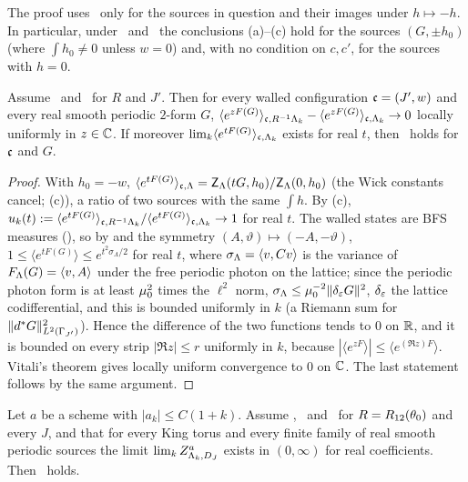The proof uses \hypF\ only for the sources in question and their images under $h\mapsto-h$. In particular, under \hypFz\ and \hypV\ the conclusions (a)--(c) hold for the sources $(G,\pm h_0)$ (where $\int h_0\ne0$ unless $w=0$) and, with no condition on $c,c'$, for the sources with $h=0$.

\begin{corollary}\label{rot:cor:walled}
Assume \hypFz\ and \hypV\ for $R$ and $J'$. Then for every walled configuration $\mathfrak c=(J',w)$ and every real smooth periodic $2$-form $G$, $\langle e^{zF(G)}\rangle_{\mathfrak c,R^{-1}\Lambda_k}-\langle e^{zF(G)}\rangle_{\mathfrak c,\Lambda_k}\to0$ locally uniformly in $z\in\mathbb C$. If moreover $\lim_k\langle e^{tF(G)}\rangle_{\mathfrak c,\Lambda_k}$ exists for real $t$, then \Kz\ holds for $\mathfrak c$ and $G$.
\end{corollary}

\begin{proof}
With $h_0=-w$, $\langle e^{tF(G)}\rangle_{\mathfrak c,\Lambda}=\mathsf Z_\Lambda(tG,h_0)/\mathsf Z_\Lambda(0,h_0)$ (the Wick constants cancel; (c)), a ratio of two sources with the same $\int h$. By (c), $u_k(t):=\langle e^{tF(G)}\rangle_{\mathfrak c,R^{-1}\Lambda_k}/\langle e^{tF(G)}\rangle_{\mathfrak c,\Lambda_k}\to1$ for real $t$. The walled states are BFS measures (), so by  and the symmetry $(A,\vartheta)\mapsto(-A,-\vartheta)$, $1\le\langle e^{tF(G)}\rangle\le e^{t^2\sigma_\Lambda/2}$ for real $t$, where $\sigma_\Lambda=\langle v,Cv\rangle$ is the variance of $F_\Lambda(G)=\langle v,A\rangle$ under the free periodic photon on the lattice; since the periodic photon form is at least $\mu_0^2$ times the $\ell^2$ norm, $\sigma_\Lambda\le\mu_0^{-2}\lVert \delta_{\varepsilon} G\rVert^2$, $\delta_{\varepsilon}$ the lattice codifferential, and this is bounded uniformly in $k$ (a Riemann sum for $\lVert d^{*} G\rVert^2_{L^2(\Gamma_{J'})}$). Hence the difference of the two functions tends to $0$ on $\mathbb R$, and it is bounded on every strip $|\Re z|\le r$ uniformly in $k$, because $|\langle e^{zF}\rangle|\le\langle e^{(\Re z)F}\rangle$. Vitali's theorem \cite{Hor90} gives locally uniform convergence to $0$ on $\mathbb C$. The last statement follows by the same argument.
\end{proof}

\begin{corollary}\label{rot:cor:Kfull}
Let $a$ be a scheme with $|a_k|\le C(1+k)$. Assume \hypF, \hypV\ and \hypCc\ for $R=R_{12}(\theta_0)$ and every $J$, and that for every King torus and every finite family of real smooth periodic sources the limit $\lim_kZ^a_{\Lambda_k,D_J}$ exists in $(0,\infty)$ for real coefficients. Then \Ka\ holds.
\end{corollary}

